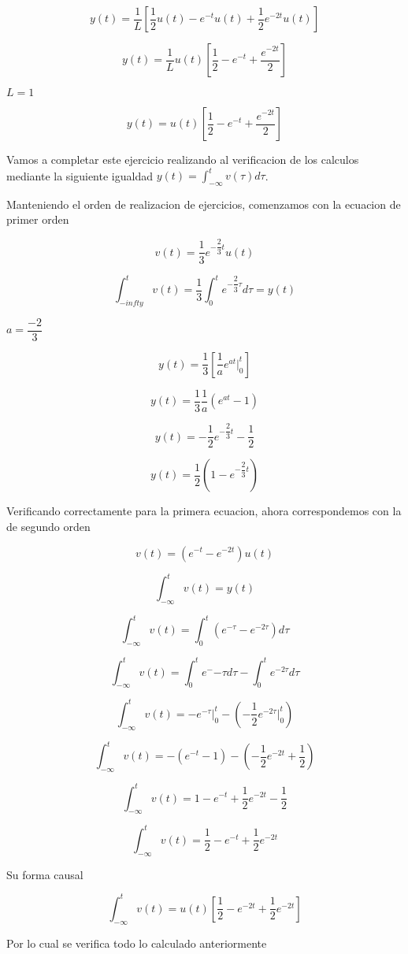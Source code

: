 $$y(t) = \dfrac{1}{L} [\dfrac{1}{2} u(t) - e^{-t} u(t) + \dfrac{1}{2} e^{-2t} u(t)] $$

$$y(t) = \dfrac{1}{L} u(t) [\dfrac{1}{2} - e^{-t} + \dfrac{e^{-2t}}{2}]$$

$L = 1$

$$y(t) = u(t) [\dfrac{1}{2} - e^{-t} + \dfrac{e^{-2t}}{2}] $$

Vamos a completar este ejercicio realizando al verificacion de los calculos mediante la siguiente igualdad $y(t) = \int_{-\infty}^{t} v(\tau) d\tau$.

Manteniendo el orden de realizacion de ejercicios, comenzamos con la ecuacion de primer orden

$$v(t) = \dfrac{1}{3} e^{-\dfrac{2}{3}t} u(t)$$

$$\int_{-infty}^{t} v(t) = \dfrac{1}{3} \int_{0}^{t} e^{-\dfrac{2}{3}\tau} d\tau = y(t) $$

$a = \dfrac{-2}{3}$

$$y(t) = \dfrac{1}{3} [\dfrac{1}{a} e^{at} \bigg\rvert_{0}^{t}] $$

$$y(t) = \dfrac{1}{3} \dfrac{1}{a} (e^{at} - 1) $$

$$y(t) = -\dfrac{1}{2} e^{-\dfrac{2}{3}t} - \dfrac{1}{2} $$

$$y(t) = \dfrac{1}{2} (1 - e^{-\dfrac{2}{3}t}) $$ 

Verificando correctamente para la primera ecuacion, ahora correspondemos con la de segundo orden

$$v(t) = (e^{-t} - e^{-2t}) u(t) $$

$$\int_{-\infty}^{t} v(t) = y(t) $$

$$\int_{-\infty}^{t} v(t) = \int_{0}^{t} (e^{-\tau} - e^{-2\tau}) d\tau $$

$$\int_{-\infty}^{t} v(t) = \int_{0}^{t} e^-{-\tau} d\tau - \int_{0}^{t} e^{-2\tau} d\tau $$ 

$$\int_{-\infty}^{t} v(t) = -e^{-\tau}\bigg\rvert_{0}^{t} - (-\dfrac{1}{2} e^{-2\tau} \bigg\rvert_{0}^{t}) $$

$$\int_{-\infty}^{t} v(t) = -(e^{-t} - 1) - (-\dfrac{1}{2} e^{-2t} + \dfrac{1}{2}) $$

$$\int_{-\infty}^{t} v(t) = 1 - e^{-t} + \dfrac{1}{2} e^{-2t} - \dfrac{1}{2}$$

$$\int_{-\infty}^{t} v(t) = \dfrac{1}{2} - e^{-t} + \dfrac{1}{2} e^{-2t}$$

Su forma causal

$$\int_{-\infty}^{t} v(t) = u(t) [\dfrac{1}{2} - e^{-2t} + \dfrac{1}{2} e^{-2t}]$$

Por lo cual se verifica todo lo calculado anteriormente
